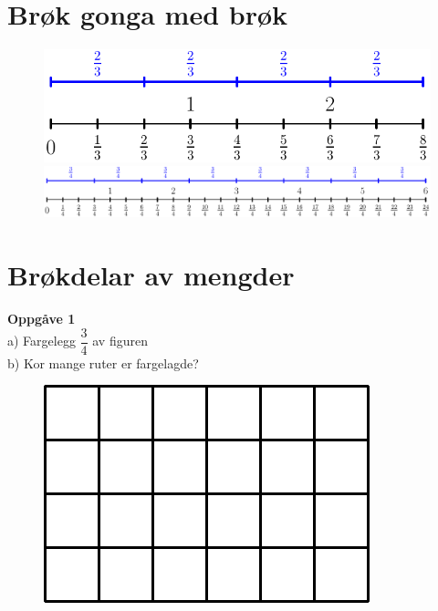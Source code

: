 





\large
\section*{Brøk gonga med brøk}

\begin{figure}
	\centering
	\includegraphics[angle=90]{tallinje3} \hspace{5cm}
	\includegraphics[angle=90]{tallinje4}
\end{figure}

\newpage
\section*{Brøkdelar av mengder}
\textbf{Oppgåve 1} \\
a) Fargelegg $ \dfrac{3}{4} $ av figuren\\
b) Kor mange ruter er fargelagde?
\begin{figure}
	\includegraphics{farg3_4}
\end{figure} \vspace{10pt}

